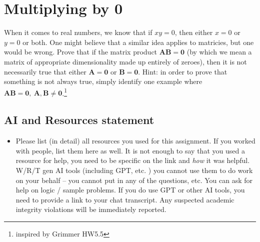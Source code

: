 \documentclass[
]{article}
\providecommand{\tightlist}{%
  \setlength{\itemsep}{0pt}\setlength{\parskip}{0pt}}
\begin{document}
\section{\texorpdfstring{Multiplying by
\(\mathbf{0}\)}{Multiplying by \textbackslash mathbf\{0\}}}\label{multiplying-by-mathbf0}

When it comes to real numbers, we know that if \(xy = 0\), then either
\(x=0\) or \(y=0\) or both. One might believe that a similar idea
applies to matricies, but one would be wrong. Prove that if the matrix
product \(\mathbf{AB=0}\) (by which we mean a matrix of appropriate
dimensionality made up entirely of zeroes), then it is not necessarily
true that either \(\mathbf{A=0}\) or \(\mathbf{B=0}\). Hint: in order to
prove that something is not always true, simply identify one example
where \(\mathbf{AB=0}, \: \mathbf{A, B \neq 0}\).\footnote{inspired by
  Grimmer HW5.5}

\subsection{AI and Resources
statement}\label{ai-and-resources-statement}

\begin{itemize}
\tightlist
\item
  Please list (in detail) all resources you used for this assignment. If
  you worked with people, list them here as well. It is not enough to
  say that you used a resource for help, you need to be specific on the
  link and \emph{how} it was helpful. W/R/T gen AI tools (including GPT,
  etc. ) you cannot use them to do work on your behalf -- you cannot put
  in any of the questions, etc. You can ask for help on logic / sample
  problems. If you do use GPT or other AI tools, you need to provide a
  link to your chat transcript. Any suspected academic integrity
  violations will be immediately reported.
\end{itemize}
\end{document}
